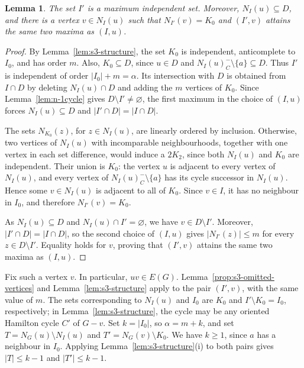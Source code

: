 \documentclass[11pt]{article}
\numberwithin{equation}{section}
\newtheorem{lemma}[theorem]{Lemma}
\theoremstyle{plain}
\theoremstyle{definition}
\theoremstyle{plain}
\begin{document}
\begin{lemma}\label{lem:secindependent}
The set $I'$ is a maximum independent set.
Moreover, $N_I(u)\subseteq D$, and there is a vertex
$v\in N_I(u)$ such that $N_{I'}(v)=K_0$ and $(I',v)$ attains the
same two maxima as $(I,u)$.
\end{lemma}

\begin{proof}
By Lemma~\ref{lem:s3-structure}, the set $K_0$ is independent,
anticomplete to $I_0$, and has order $m$.
Also, $K_0\subseteq D$, since $u\in D$ and
$N_I(u)_C^-\setminus\{a\}\subseteq D$.
Thus $I'$ is independent of order $|I_0|+m=\alpha$.
Its intersection with $D$ is obtained from $I\cap D$ by deleting
$N_I(u)\cap D$ and adding the $m$ vertices of $K_0$.
Since Lemma~\ref{lem:n-1cycle}    gives $D\setminus I'\neq\varnothing$,
the first maximum in the choice of $(I,u)$ forces
$N_I(u)\subseteq D$ and $|I'\cap D|=|I\cap D|$.

The sets $N_{K_0}(z)$, for $z\in N_I(u)$, are linearly ordered by
inclusion.
Otherwise, two vertices of $N_I(u)$ with incomparable
neighbourhoods, together with one vertex in each set difference,
would induce a $2K_2$, since both $N_I(u)$ and $K_0$ are independent.
Their union is $K_0$: the vertex $u$ is adjacent to every vertex of
$N_I(u)$, and every vertex of
$N_I(u)_C^-\setminus\{a\}$ has its cycle successor in $N_I(u)$.
Hence some $v\in N_I(u)$ is adjacent to all of $K_0$.
Since $v\in I$, it has no neighbour in $I_0$, and therefore
$N_{I'}(v)=K_0$.

As $N_I(u)\subseteq D$ and $N_I(u)\cap I'=\varnothing$, we have
$v\in D\setminus I'$.
Moreover, $|I'\cap D|=|I\cap D|$, so the second choice of $(I,u)$
gives $|N_{I'}(z)|\leq m$ for every $z\in D\setminus I'$.
Equality holds for $v$, proving that $(I',v)$ attains the same two
maxima as $(I,u)$.
\end{proof}


Fix such a vertex $v$.
In particular, $uv\in E(G)$.
Lemma~\ref{prop:s3-omitted-vertices} and
Lemma~\ref{lem:s3-structure} apply to the pair $(I',v)$, with the
same value of $m$.
The sets corresponding to $N_I(u)$ and $I_0$ are $K_0$ and
$I'\setminus K_0=I_0$, respectively; in
Lemma~\ref{lem:s3-structure}, the cycle may be any oriented Hamilton
cycle $C'$ of $G-v$.
Set $k=|I_0|$, so $\alpha=m+k$, and   set
$T=N_G(u)\setminus N_I(u)$ and $T'=N_G(v)\setminus K_0$.
We have $k\geq 1$, since $a$ has a neighbour in $I_0$.
Applying Lemma~\ref{lem:s3-structure}\textup{(i)} to both pairs gives
$|T|\leq k-1$ and $|T'|\leq k-1$.
\end{document}
